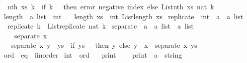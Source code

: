 \begin{isabellebody}
\ \ {\isachardoublequoteopen}nth\ xs\ k\ {\isacharequal}\ {\isacharparenleft}if\ k\ {\isacharless}\ {}\ then\ error\ {\isacharprime}{\isacharprime}negative\ index{\isacharprime}{\isacharprime}\ else\ List{\isachardot}nth\ xs\ {\isacharparenleft}nat\ k{\isacharparenright}{\isacharparenright}{\isachardoublequoteclose}\isanewline
\isanewline
{}\isamarkupfalse%
\ length\ {\isacharcolon}{\isacharcolon}\ {\isachardoublequoteopen}{\isacharprime}a\ list\ {\isasymRightarrow}\ int{\isachardoublequoteclose}\ \isanewline
\ \ {\isachardoublequoteopen}length\ xs\ {\isacharequal}\ int\ {\isacharparenleft}List{\isachardot}length\ xs{\isacharparenright}{\isachardoublequoteclose}\isanewline
\isanewline
{}\isamarkupfalse%
\ replicate\ {\isacharcolon}{\isacharcolon}\ {\isachardoublequoteopen}int\ {\isasymRightarrow}\ {\isacharprime}a\ {\isasymRightarrow}\ {\isacharprime}a\ list{\isachardoublequoteclose}\ \isanewline
\ \ {\isachardoublequoteopen}replicate\ k\ {\isacharequal}\ List{\isachardot}replicate\ {\isacharparenleft}nat\ k{\isacharparenright}{\isachardoublequoteclose}\isanewline
\isanewline
{}\isamarkupfalse%
\ separate\ {\isacharcolon}{\isacharcolon}\ {\isachardoublequoteopen}{\isacharprime}a\ {\isasymRightarrow}\ {\isacharprime}a\ list\ {\isasymRightarrow}\ {\isacharprime}a\ list{\isachardoublequoteclose}\ \isanewline
\ \ \ \ {\isachardoublequoteopen}separate\ x\ {\isacharbrackleft}{\isacharbrackright}\ {\isacharequal}\ {\isacharbrackleft}{\isacharbrackright}{\isachardoublequoteclose}\isanewline
\ \ {\isacharbar}\ {\isachardoublequoteopen}separate\ x\ {\isacharparenleft}y\ {\isacharhash}\ ys{\isacharparenright}\ {\isacharequal}\ {\isacharparenleft}if\ ys\ {\isacharequal}\ {\isacharbrackleft}{\isacharbrackright}\ then\ {\isacharbrackleft}y{\isacharbrackright}\ else\ y\ {\isacharhash}\ x\ {\isacharhash}\ separate\ x\ ys{\isacharparenright}{\isachardoublequoteclose}%
\isamarkuptrue%
\isamarkupfalse%
\ ord\ {\isacharequal}\ eq\ {\isacharplus}\ linorder\isanewline
\isanewline
{}\isamarkupfalse%
\ int\ {\isacharcolon}{\isacharcolon}\ ord%
\isadelimproof
\ %
\endisadelimproof
%
\isatagproof
\isacommand{{\isachardot}{\isachardot}}\isamarkupfalse%
%
\endisatagproof
{\isafoldproof}%
%
\isadelimproof
%
\endisadelimproof
\isanewline
\isanewline
{}\isamarkupfalse%
\ print\ {\isacharequal}\isanewline
\ \ \ print\ {\isacharcolon}{\isacharcolon}\ {\isachardoublequoteopen}{\isacharprime}a\ {\isasymRightarrow}\ string{\isachardoublequoteclose}\isanewline

\end{isabellebody}
